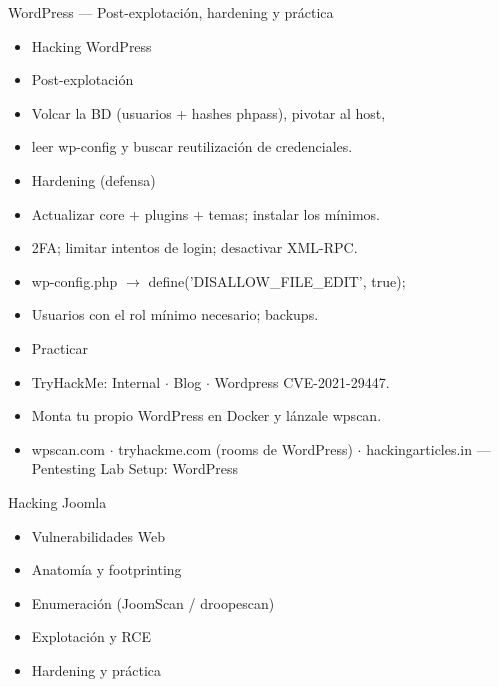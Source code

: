 \documentclass[aspectratio=169,10pt]{beamer}
\begin{document}
\begin{frame}[allowframebreaks]{WordPress --- Post-explotación, hardening y práctica}
\small
  \begin{itemize}
  \item Hacking WordPress
  \item Post-explotación
  \item Volcar la BD (usuarios + hashes phpass), pivotar al host,
  \item leer wp-config y buscar reutilización de credenciales.
  \item Hardening (defensa)
  \item Actualizar core + plugins + temas; instalar los mínimos.
  \item 2FA; limitar intentos de login; desactivar XML-RPC.
  \item wp-config.php $\rightarrow$ define('DISALLOW\_FILE\_EDIT', true);
  \item Usuarios con el rol mínimo necesario; backups.
  \item Practicar
  \item TryHackMe: Internal $\cdot$ Blog $\cdot$ Wordpress CVE-2021-29447.
  \item Monta tu propio WordPress en Docker y lánzale wpscan.
  \item wpscan.com $\cdot$ tryhackme.com (rooms de WordPress) $\cdot$ hackingarticles.in --- Pentesting Lab Setup: WordPress
  \end{itemize}
\end{frame}

\begin{frame}[allowframebreaks]{Hacking Joomla}
\small
  \begin{itemize}
  \item Vulnerabilidades Web
  \item Anatomía y footprinting
  \item Enumeración (JoomScan / droopescan)
  \item Explotación y RCE
  \item Hardening y práctica
  \end{itemize}
\end{frame}
\end{document}
